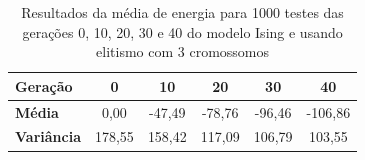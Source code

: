 \begin{table}[htb]
	\centering
	\begin{tabular}{|l|c|c|c|c|c|}
		\hline
		\textbf{Geração}   & \textbf{0} & \textbf{10} & \textbf{20} & \textbf{30} & \textbf{40} \\ \hline
		\textbf{Média}     & 0,00       & -47,49      & -78,76      & -96,46      & -106,86      \\ \hline
		\textbf{Variância} & 178,55     & 158,42      & 117,09       & 106,79       & 103,55       \\ \hline
	\end{tabular}
	\caption{Resultados da média de energia para 1000 testes das gerações 0, 10, 20, 30 e 40 do modelo Ising e usando elitismo com 3 cromossomos}
	\label{tab:resultados_medias_var}
\end{table}

